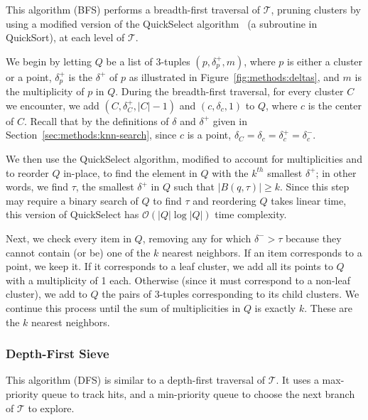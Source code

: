 This algorithm (BFS) performs a breadth-first traversal of $\mathcal{T}$, pruning clusters by using a modified version of the QuickSelect algorithm~\cite{hoare1961algorithm} (a subroutine in QuickSort), at each level of $\mathcal{T}$.

We begin by letting $Q$ be a list of 3-tuples $(p, \delta^{+}_{p}, m)$, where $p$ is either a cluster or a point, $\delta^{+}_{p}$ is the $\delta^{+}$ of $p$ as illustrated in Figure~\ref{fig:methods:deltas}, and $m$ is the multiplicity of $p$ in $Q$.
During the breadth-first traversal, for every cluster $C$ we encounter, we add $(C, \delta^{+}_{C}, |C| - 1)$ and $(c, \delta_{c}, 1)$ to $Q$, where $c$ is the center of $C$.
Recall that by the definitions of $\delta$ and $\delta^{+}$ given in Section~\ref{sec:methods:knn-search}, since $c$ is a point, $\delta_{C} = \delta_{c} = \delta^{+}_{c} = \delta^{-}_{c}$.

We then use the QuickSelect algorithm, modified to account for multiplicities and to reorder $Q$ in-place, to find the element in $Q$ with the $k^{th}$ smallest $\delta^{+}$; in other words, we find $\tau$, the smallest $\delta^{+}$ in $Q$ such that $\left| B(q, \tau) \right| \geq k$.
Since this step may require a binary search of $Q$ to find $\tau$ and reordering $Q$ takes linear time, this version of QuickSelect has $\mathcal{O}\left(|Q| \log |Q|\right)$ time complexity.

Next, we check every item in $Q$, removing any for which $\delta^{-} > \tau$ because they cannot contain (or be) one of the $k$ nearest neighbors.
If an item corresponds to a point, we keep it.
If it corresponds to a leaf cluster, we add all its points to $Q$ with a multiplicity of 1 each.
Otherwise (since it must correspond to a non-leaf cluster), we add to $Q$ the pairs of 3-tuples corresponding to its child clusters.
We continue this process until the sum of multiplicities in $Q$ is exactly $k$.
These are the $k$ nearest neighbors.

\subsubsection{Depth-First Sieve}
\label{sec:methods:knn-search:depth-first-sieve}

This algorithm (DFS) is similar to a depth-first traversal of $\mathcal{T}$.
It uses a max-priority queue to track hits, and a min-priority queue to choose the next branch of $\mathcal{T}$ to explore.

